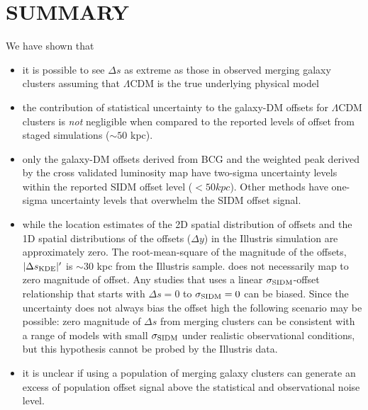 \section{SUMMARY}
We have shown that 
\begin{itemize}
		\item it is possible to  
			see $\Delta s$ as extreme as those in observed merging galaxy clusters assuming that
			$\Lambda$CDM is the true underlying physical model  \\

		\item the contribution of statistical uncertainty to the galaxy-DM offsets 
			for $\Lambda$CDM clusters is {\it not} negligible when compared to the reported
			levels of offset from staged simulations ($\sim 50$ kpc).\\ 

		\item only the galaxy-DM offsets derived from BCG and the weighted peak derived by the cross validated
			luminosity map have two-sigma uncertainty levels within the reported SIDM offset
			level ($< 50 kpc$). Other methods have one-sigma uncertainty levels that overwhelm the
			SIDM offset signal.\\ 

		\item while the location estimates of the 2D spatial distribution of offsets and the
			1D spatial distributions of the offsets ($\Delta y$) in the Illustris
			simulation are approximately zero.
			The root-mean-square of the magnitude of the
		offsets, $|\Delta s_{\rm KDE}|'$ is $\sim 30$ kpc from the Illustris sample. 
			does not necessarily map to zero magnitude of offset.  
			Any studies that uses a linear $\sigma_{\rm SIDM}$-offset relationship
			that starts with $\Delta s = 0$ to $\sigma_{\rm SIDM} = 0$ can be biased. 
			Since the uncertainty does not always bias the offset high 
		the following scenario may be possible: zero magnitude of
			$\Delta s$ from merging clusters 
			can be consistent with a range of models with small
			$\sigma_{\rm SIDM}$ under realistic observational conditions,
			but this hypothesis cannot be probed by the Illustris data.\\
  
	 \item it is unclear if using a population of merging galaxy clusters 
		 can generate an excess of population offset signal above the statistical
		 and observational noise level.   
			\\



\end{itemize}
